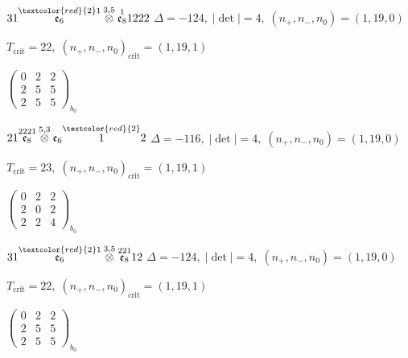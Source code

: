 \documentclass[10pt]{article}
\begin{document}
\smallskip

$31\overset{\textcolor{red}{2}1}{\mathfrak{e}_6}\overset{3,5}{\otimes}\overset{1}{\mathfrak{e}_8}1222$ \quad $\Delta=-124,\; |\det|=4,\; (n_+,n_-,n_0)=(1,19,0)$

\hspace{1em}$T_{\text{crit}}=22,\; (n_+,n_-,n_0)_{\text{crit}}=(1,19,1)$

\hspace{2em}$\left(\begin{smallmatrix}0 & 2 & 2 \\ 2 & 5 & 5 \\ 2 & 5 & 5\end{smallmatrix}\right)_{\!b_0}$

\smallskip

$21\overset{2221}{\mathfrak{e}_8}\overset{5,3}{\otimes}\mathfrak{e}_6\overset{\textcolor{red}{2}}{1}2$ \quad $\Delta=-116,\; |\det|=4,\; (n_+,n_-,n_0)=(1,19,0)$

\hspace{1em}$T_{\text{crit}}=23,\; (n_+,n_-,n_0)_{\text{crit}}=(1,19,1)$

\hspace{2em}$\left(\begin{smallmatrix}0 & 2 & 2 \\ 2 & 0 & 2 \\ 2 & 2 & 4\end{smallmatrix}\right)_{\!b_0}$

\smallskip

$31\overset{\textcolor{red}{2}1}{\mathfrak{e}_6}\overset{3,5}{\otimes}\overset{221}{\mathfrak{e}_8}12$ \quad $\Delta=-124,\; |\det|=4,\; (n_+,n_-,n_0)=(1,19,0)$

\hspace{1em}$T_{\text{crit}}=22,\; (n_+,n_-,n_0)_{\text{crit}}=(1,19,1)$

\hspace{2em}$\left(\begin{smallmatrix}0 & 2 & 2 \\ 2 & 5 & 5 \\ 2 & 5 & 5\end{smallmatrix}\right)_{\!b_0}$
\end{document}
